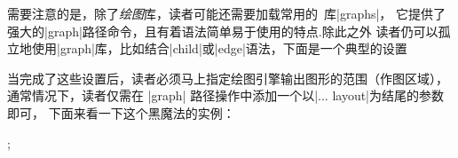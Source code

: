 需要注意的是，除了\emph{绘图}库，读者可能还需要加载常用的\tikzname\ 库|graphs|，
它提供了强大的|graph|路径命令，且有着语法简单易于使用的特点.除此之外
读者仍可以孤立地使用|graph|库，比如结合|child|或|edge|语法，下面是一个典型的设置

\begin{codeexample}
\usetikzlibrary{graphs, graphdrawing}
\end{codeexample}

当完成了这些设置后，读者必须马上指定绘图引擎输出图形的范围（作图区域），
通常情况下，读者仅需在 |graph| 路径操作中添加一个以|... layout|为结尾的参数即可，
下面来看一下这个黑魔法的实例：

\begin{codeexample}[]
  ;    
\end{codeexample}

